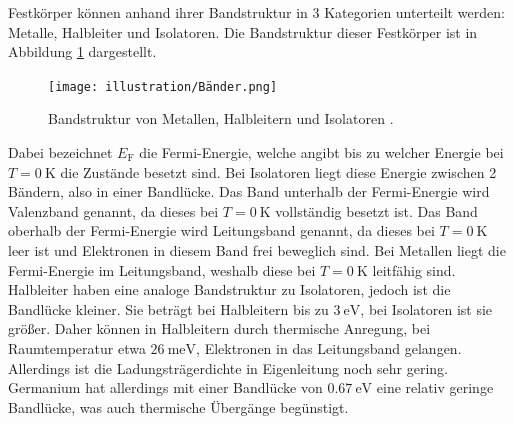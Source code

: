 \noindent Festkörper können anhand ihrer Bandstruktur in 3 Kategorien unterteilt werden: Metalle, Halbleiter und Isolatoren.
Die Bandstruktur dieser Festkörper ist in Abbildung \ref{fig:Band} dargestellt.
\begin{figure}[H]
    \centering
    \texttt{[image: illustration/Bänder.png]}
    \caption{Bandstruktur von Metallen, Halbleitern und Isolatoren \cite{demtröder}.}
    \label{fig:Band}
\end{figure}
\noindent Dabei bezeichnet $E_\text{F}$ die Fermi-Energie, welche angibt bis zu welcher Energie bei $T=\qty{0}{\kelvin}$ die Zustände besetzt sind.
Bei Isolatoren liegt diese Energie zwischen 2 Bändern, also in einer Bandlücke. Das Band unterhalb der Fermi-Energie wird Valenzband genannt, 
da dieses bei $T=\qty{0}{\kelvin}$ vollständig besetzt ist. Das Band oberhalb der Fermi-Energie wird Leitungsband genannt, da dieses bei $T=\qty{0}{\kelvin}$ leer ist und 
Elektronen in diesem Band frei beweglich sind. Bei Metallen liegt die Fermi-Energie im Leitungsband, weshalb diese bei $T=\qty{0}{\kelvin}$ leitfähig sind.
Halbleiter haben eine analoge Bandstruktur zu Isolatoren, jedoch ist die Bandlücke kleiner. Sie beträgt bei Halbleitern bis zu $\qty{3}{\eV}$, bei Isolatoren 
ist sie größer. Daher können in Halbleitern durch thermische Anregung, bei Raumtemperatur etwa $\qty{26}{\milli\eV}$, Elektronen in das Leitungsband gelangen. 
Allerdings ist die Ladungsträgerdichte in Eigenleitung noch sehr gering. Germanium hat allerdings mit einer Bandlücke von $\qty{0.67}{\eV}$ eine relativ geringe Bandlücke, was auch thermische Übergänge 
begünstigt.

